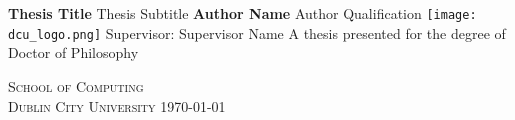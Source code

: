 \begin{titlepage}
    \begin{center}
        \vspace*{1cm}
        \Huge
        \textbf{Thesis Title}
\vfill
        \LARGE
        Thesis Subtitle
\vfill       
        \LARGE
        \textbf{Author Name}
\vfill     
        Author Qualification
\vfill
        \texttt{[image: dcu\_logo.png]}
\vfill
        Supervisor: Supervisor Name
\vfill      
        \Large
        A thesis presented for the degree of Doctor of Philosophy
        
\vfill
        \LARGE
	    \textsc{School of Computing \\
	    Dublin City University}
\vfill	    
	    \LARGE
	    \monthyeardate\today

    \end{center}
\end{titlepage}